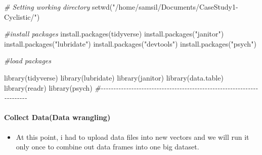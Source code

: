 \documentclass[
]{article}
\newenvironment{Shaded}{\begin{snugshade}}{\end{snugshade}}
\newcommand{\CommentTok}[1]{\textcolor[rgb]{0.56,0.35,0.01}{\textit{#1}}}
\newcommand{\FunctionTok}[1]{\textcolor[rgb]{0.00,0.00,0.00}{#1}}
\newcommand{\NormalTok}[1]{#1}
\newcommand{\StringTok}[1]{\textcolor[rgb]{0.31,0.60,0.02}{#1}}
\providecommand{\tightlist}{%
  \setlength{\itemsep}{0pt}\setlength{\parskip}{0pt}}
\begin{document}
\begin{Shaded}
\begin{Highlighting}[]
\CommentTok{\# Setting working directory}
\FunctionTok{setwd}\NormalTok{(}\StringTok{"/home/samsil/Documents/CaseStudy1{-}Cyclistic/"}\NormalTok{)}

\CommentTok{\#install packages}
\FunctionTok{install.packages}\NormalTok{(}\StringTok{\textquotesingle{}tidyverse\textquotesingle{}}\NormalTok{)}
\FunctionTok{install.packages}\NormalTok{(}\StringTok{"janitor"}\NormalTok{) }
\FunctionTok{install.packages}\NormalTok{(}\StringTok{"lubridate"}\NormalTok{)}
\FunctionTok{install.packages}\NormalTok{(}\StringTok{"devtools"}\NormalTok{)}
\FunctionTok{install.packages}\NormalTok{(}\StringTok{"psych"}\NormalTok{)}

\CommentTok{\#load packages}

\FunctionTok{library}\NormalTok{(tidyverse)}
\FunctionTok{library}\NormalTok{(lubridate)}
\FunctionTok{library}\NormalTok{(janitor)}
\FunctionTok{library}\NormalTok{(data.table)}
\FunctionTok{library}\NormalTok{(readr)}
\FunctionTok{library}\NormalTok{(psych)}
\CommentTok{\#{-}{-}{-}{-}{-}{-}{-}{-}{-}{-}{-}{-}{-}{-}{-}{-}{-}{-}{-}{-}{-}{-}{-}{-}{-}{-}{-}{-}{-}{-}{-}{-}{-}{-}{-}{-}{-}{-}{-}{-}{-}{-}{-}{-}{-}{-}{-}{-}{-}{-}{-}{-}{-}{-}{-}{-}{-}{-}{-}{-}{-}{-}{-}{-}{-}{-}{-}{-}{-}{-}{-}}
\end{Highlighting}
\end{Shaded}

\hypertarget{collect-datadata-wrangling}{%
\paragraph{\texorpdfstring{\textbf{Collect Data(Data
wrangling)}}{Collect Data(Data wrangling)}}\label{collect-datadata-wrangling}}

\begin{itemize}
\tightlist
\item
  At this point, i had to upload data files into new vectors and we will
  run it only once to combine out data frames into one big dataset.
\end{itemize}
\end{document}
